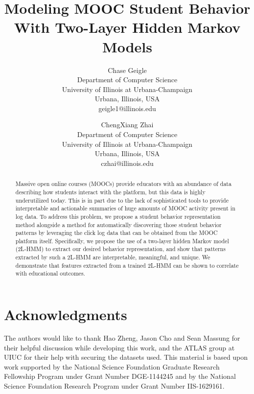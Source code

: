 \documentclass[a4,notitlepage,12pt]{jedm}
\begin{document}
\title{Modeling MOOC Student Behavior With Two-Layer Hidden Markov Models}

\author{%
  {\large Chase Geigle}\\Department of Computer Science\\University
  of Illinois at Urbana-Champaign\\Urbana, Illinois,
  USA\\geigle1@illinois.edu
  \and
  {\large ChengXiang Zhai}\\Department of Computer Science\\University of
  Illinois at Urbana-Champaign\\Urbana, Illinois, USA\\czhai@illinois.edu}

\maketitle

\begin{abstract}
  Massive open online courses (MOOCs) provide educators with an abundance
  of data describing how students interact with the platform, but this data
  is highly underutilized today. This is in part due to the lack of
  sophisticated tools to provide interpretable and actionable summaries of
  huge amounts of MOOC activity present in log data. To address this problem, we
  propose a student behavior representation method alongside a method for
  automatically discovering those student behavior patterns by leveraging
  the click log data that can be obtained from the MOOC platform itself.
  Specifically, we propose the use of a two-layer hidden Markov model
  (2L-HMM) to extract our desired behavior representation, and show that
  patterns extracted by such a 2L-HMM are interpretable, meaningful, and
  unique. We demonstrate that features extracted from a trained 2L-HMM can
  be shown to correlate with educational outcomes.
\end{abstract}

\newcommand{\NSFGRFP}{This material is based upon work supported by the
National Science Foundation Graduate Research Fellowship Program under
Grant Number DGE-1144245 and by the National Science Foundation Research Program under Grant Number IIS-1629161. }

\newcommand{\acknowledgments}{The authors would like to thank Hao Zheng,
Jason Cho and Sean Massung for their helpful discussion while developing
this work, and the ATLAS group at UIUC for their help with securing the
datasets used. \NSFGRFP{}}













\section{Acknowledgments}
\acknowledgments{}



\end{document}
